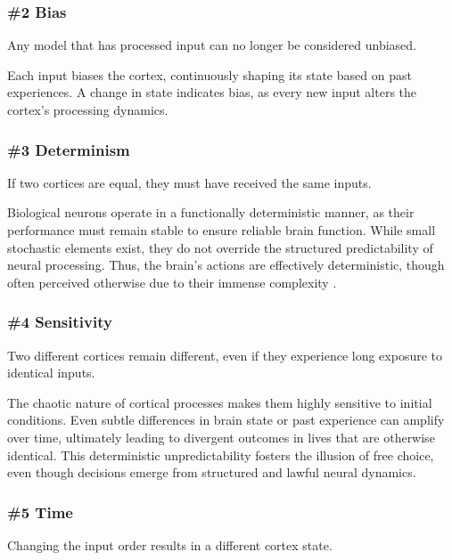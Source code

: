 \documentclass{article}
\newenvironment{one_assertion}[1]
{
	\begin{tabular}{p{1.5cm}p{8.2cm}}
		\textbf{Assertion:} & #1 \\
	}{
	\end{tabular}\\
}
\begin{document}
	\subsubsection*{\#2 Bias}
	\begin{one_assertion}
		{Any model that has processed input can no longer be considered unbiased.}
	\end{one_assertion}
	
	Each input biases the cortex, continuously shaping its state based on past experiences. A change in state indicates bias, as every new input alters the cortex's processing dynamics.
	
	\subsubsection*{\#3 Determinism}
	\begin{one_assertion}
		{If two cortices are equal, they must have received the same inputs.}
	\end{one_assertion}
	
	Biological neurons operate in a functionally deterministic manner, as their performance must remain stable to ensure reliable brain function. While small stochastic elements exist, they do not override the structured predictability of neural processing. Thus, the brain's actions are effectively deterministic, though often perceived otherwise due to their immense complexity \cite{AtlanticFreeWill}.
	
	\subsubsection*{\#4 Sensitivity}
	\begin{one_assertion}
		{Two different cortices remain different, even if they experience long exposure to identical inputs.}
	\end{one_assertion}
	
	The chaotic nature of cortical processes makes them highly sensitive to initial conditions. Even subtle differences in brain state or past experience can amplify over time, ultimately leading to divergent outcomes in lives that are otherwise identical. This deterministic unpredictability fosters the illusion of free choice, even though decisions emerge from structured and lawful neural dynamics.
	
	\subsubsection*{\#5 Time}
	\begin{one_assertion}
		{Changing the input order results in a different cortex state.}
	\end{one_assertion}
	
\end{document}
